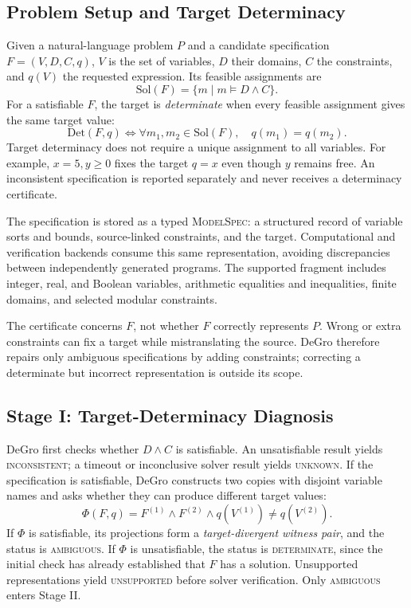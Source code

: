 \documentclass[sigconf,anonymous]{aamas}
\begin{document}
\subsection{Problem Setup and Target Determinacy}
Given a natural-language problem $P$ and a candidate specification $F=(V,D,C,q)$, $V$ is the set of variables, $D$ their domains, $C$ the constraints, and $q(V)$ the requested expression. Its feasible assignments are
\begin{equation}
\mathrm{Sol}(F)=\{m\mid m\models D\land C\}.
\label{eq:solutions}
\end{equation}
For a satisfiable $F$, the target is \emph{determinate} when every feasible assignment gives the same target value:
\begin{equation}
\mathrm{Det}(F,q)\iff
\forall m_1,m_2\in\mathrm{Sol}(F),\quad q(m_1)=q(m_2).
\label{eq:determinacy}
\end{equation}
Target determinacy does not require a unique assignment to all variables. For example, $x=5,y\geq0$ fixes the target $q=x$ even though $y$ remains free. An inconsistent specification is reported separately and never receives a determinacy certificate.

The specification is stored as a typed \textsc{ModelSpec}: a structured record of variable sorts and bounds, source-linked constraints, and the target. Computational and verification backends consume this same representation, avoiding discrepancies between independently generated programs. The supported fragment includes integer, real, and Boolean variables, arithmetic equalities and inequalities, finite domains, and selected modular constraints.

The certificate concerns $F$, not whether $F$ correctly represents $P$. Wrong or extra constraints can fix a target while mistranslating the source. DeGro therefore repairs only ambiguous specifications by adding constraints; correcting a determinate but incorrect representation is outside its scope.

\subsection{Stage I: Target-Determinacy Diagnosis}
DeGro first checks whether $D\land C$ is satisfiable. An unsatisfiable result yields \textsc{inconsistent}; a timeout or inconclusive solver result yields \textsc{unknown}. If the specification is satisfiable, DeGro constructs two copies with disjoint variable names and asks whether they can produce different target values:
\begin{equation}
\Phi(F,q)=F^{(1)}\land F^{(2)}\land
q(V^{(1)})\neq q(V^{(2)}).
\label{eq:query}
\end{equation}
If $\Phi$ is satisfiable, its projections form a \emph{target-divergent witness pair}, and the status is \textsc{ambiguous}. If $\Phi$ is unsatisfiable, the status is \textsc{determinate}, since the initial check has already established that $F$ has a solution. Unsupported representations yield \textsc{unsupported} before solver verification. Only \textsc{ambiguous} enters Stage II.
\end{document}
